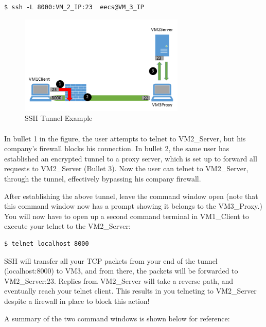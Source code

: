 \begin{Verbatim}[frame=single] 
$ ssh -L 8000:VM_2_IP:23  eecs@VM_3_IP
\end{Verbatim}


\begin{figure}[htb]
        \centering
        \includegraphics*[width=0.70\textwidth]{Figs/Tunnel.png}
        \caption{SSH Tunnel Example}
        \label{fig:sshtunnel}
\end{figure}
\paragraph{} In bullet 1 in the figure, the user attempts to telnet to VM2\_Server, but his company's firewall blocks his connection. In bullet 2, the same user has established an encrypted tunnel to a proxy server, which is set up to forward all requests to VM2\_Server (Bullet 3). Now the user can telnet to VM2\_Server, through the tunnel, effectively bypassing his company firewall.

After establishing the above tunnel, leave the command window open (note that this command window now has a prompt showing it belongs to the VM3\_Proxy.) You will now have to open up a second command terminal in VM1\_Client to execute your telnet to the VM2\_Server:

\begin{Verbatim}[frame=single] 
$ telnet localhost 8000
\end{Verbatim}

SSH will transfer all your TCP packets from your end of the tunnel (localhost:8000) to VM3, and from there, the packets will be forwarded to VM2\_Server:23. Replies from VM2\_Server will take a reverse path, and eventually reach your telnet client. This results in you telneting to VM2\_Server despite a firewall in place to block this action!

A summary of the two command windows is shown below for reference:

